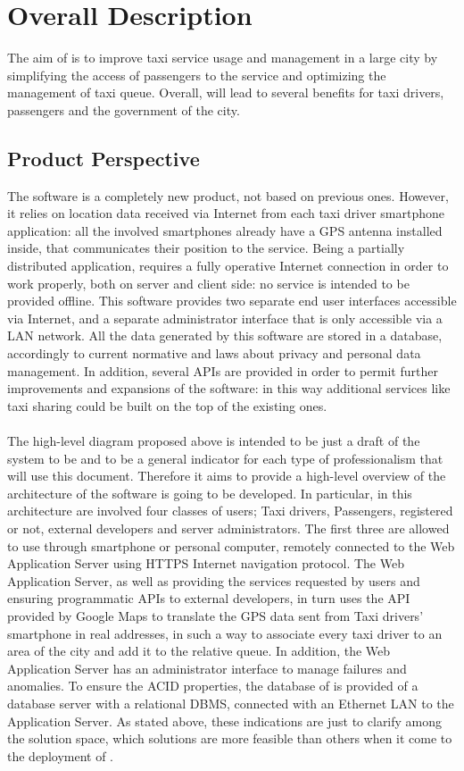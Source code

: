 \section{Overall Description}
The aim of \myTaxiService{} is to improve taxi service usage and management in a large city by simplifying the access of passengers to the service and optimizing the management of taxi queue.
Overall, \myTaxiService{} will lead to several benefits for taxi drivers, passengers and the government of the city.
%
\subsection{Product Perspective}
The software \myTaxiService{} is a completely new product, not based on previous ones.
However, it relies on location data received via Internet from each taxi driver smartphone application: all the involved smartphones already have a GPS antenna installed inside, that communicates their position to the service.
Being a partially distributed application, \myTaxiService{} requires a fully operative Internet connection in order to work properly, both on server and client side: no service is intended to be provided offline.
This software provides two separate end user interfaces accessible via Internet, and a separate administrator interface that is only accessible via a LAN network.
All the data generated by this software are stored in a database, accordingly to current normative and laws about privacy and personal data management.
In addition, several APIs are provided in order to permit further improvements and expansions of the software: in this way additional services like taxi sharing could be built on the top of the existing ones.\\
\showGeneralDiagram{}\\
The high-level diagram proposed above is intended to be just a draft of the system to be and to be a general indicator for each type of professionalism that will use this document.
Therefore it aims to provide a high-level overview of the architecture of the software is going to be developed.
In particular, in this architecture are involved four classes of users; Taxi drivers, Passengers, registered or not, external developers and server administrators.
The first three are allowed to use \myTaxiService{} through smartphone or personal computer, remotely connected to the Web Application Server using HTTPS Internet navigation protocol.
The Web Application Server, as well as providing the services requested by users and ensuring programmatic APIs to external developers, in turn uses the API provided by Google Maps to translate the GPS data sent from Taxi drivers' smartphone in real addresses, in such a way to associate every taxi driver to an area of ​​the city and add it to the relative queue.
In addition, the Web Application Server has an administrator interface to manage failures and anomalies. To ensure the ACID properties, the database of \myTaxiService{} is provided of a database server with a relational DBMS, connected with an Ethernet LAN to the Application Server.
As stated above, these indications are just to clarify among the solution space, which solutions are more feasible than others when it come to the deployment of \myTaxiService{}.
%
